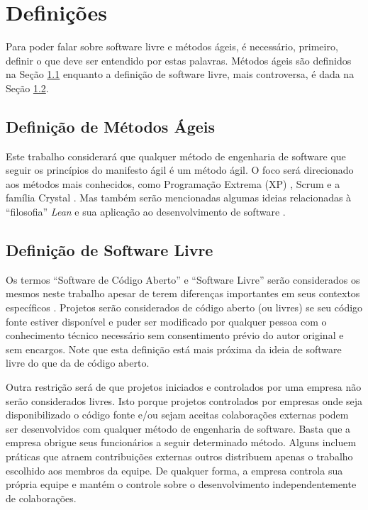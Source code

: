 \chapter{Definições}
\label{cap:definicoes}

Para poder falar sobre software livre e métodos ágeis, é necessário,
primeiro, definir o que deve ser entendido por estas palavras. Métodos
ágeis são definidos na Seção \ref{sec:agile-def} enquanto a definição
de software livre, mais controversa, é dada na Seção \ref{sec:os-def}.

\section{Definição de Métodos Ágeis}
\label{sec:agile-def}

Este trabalho considerará que qualquer método de engenharia de
software que seguir os princípios do manifesto ágil
\cite{AgileManifesto} é um método ágil. O foco será direcionado aos
métodos mais conhecidos, como Programação Extrema (XP) \cite{XP02},
Scrum \cite{Schwaber2004} e a família Crystal \cite{Cockburn2002}. Mas
também serão mencionadas algumas ideias relacionadas à ``filosofia''
\emph{Lean} \cite{Ohno1998} e sua aplicação ao desenvolvimento de
software \cite{Poppendieck2005}.

\section{Definição de Software Livre}
\label{sec:os-def}

Os termos ``Software de Código Aberto'' e ``Software Livre'' serão
considerados os mesmos neste trabalho apesar de terem diferenças
importantes em seus contextos específicos \cite[Ch. 1, Free Versus
Open source]{Fogel2005}. Projetos serão considerados de código aberto
(ou livres) se seu código fonte estiver disponível e puder ser
modificado por qualquer pessoa com o conhecimento técnico necessário
sem consentimento prévio do autor original e sem encargos. Note que
esta definição está mais próxima da ideia de software livre do que da
de código aberto.

Outra restrição será de que projetos iniciados e controlados por uma
empresa não serão considerados livres. Isto porque projetos
controlados por empresas onde seja disponibilizado o código fonte e/ou
sejam aceitas colaborações externas podem ser desenvolvidos com
qualquer método de engenharia de software. Basta que a empresa obrigue
seus funcionários a seguir determinado método. Alguns incluem práticas
que atraem contribuições externas outros distribuem apenas o trabalho
escolhido aos membros da equipe. De qualquer forma, a empresa controla
sua própria equipe e mantém o controle sobre o desenvolvimento
independentemente de colaborações.

